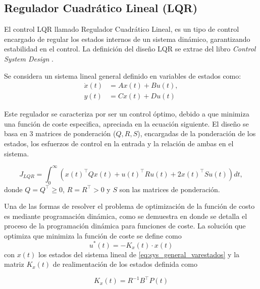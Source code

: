 \subsection{Regulador Cuadrático Lineal (LQR)}

El control LQR llamado Regulador Cuadrático Lineal, es un tipo de control encargado de regular los estados internos de un sistema dinámico, garantizando estabilidad en el control. La definición del diseño LQR se extrae del libro \textit{Control System Design} \cite{goodwin2001control}. 

Se considera un sistema lineal general definido en variables de estados como:
\begin{subequations} \label{eq:sys_general_varestados}
    \begin{align}
        \Dot{x}(t) & = A x(t) + B u(t), \\
        y(t) & = C x(t) + D u(t)
    \end{align}    
\end{subequations}

Este regulador se caracteriza por ser un control óptimo, debido a que minimiza una función de coste especifica, apreciada en la ecuación siguiente. El diseño se basa en 3 matrices de ponderación ($Q,R,S$), encargadas de la ponderación de los estados, los esfuerzos de control en la entrada y la relación de ambas en el sistema. 

\begin{equation} \label{eq:lqr_funcioncoste}
    J_{LQR} = \int_0^\infty \left( x(t)^{\top} Q x(t) + u(t)^{\top} R u(t) + 2 x(t)^{\top} S u(t)\right) dt,
\end{equation}
donde $Q=Q^{\top}\geq0$, $R=R^{\top}>0$ y $S$ son las matrices de ponderación. 

Una de las formas de resolver el problema de optimización de la función de costo es mediante programación dinámica, como se demuestra en \cite{bertsekas2012dynamic} donde se detalla el proceso de la programación dinámica para funciones de coste. La solución que optimiza que minimiza la función de coste se define como
\begin{equation}
    u^*(t)= -K_x(t) \cdot x(t)
\end{equation}
con $x(t)$ los estados del sistema lineal de \eqref{eq:sys_general_varestados} y la matriz $K_x(t)$ de realimentación de los estados definida como

\begin{equation}
    K_x(t) = R^{-1} B^{\top} P(t)
\end{equation}

